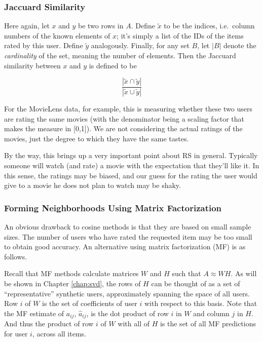 \subsubsection{Jaccuard Similarity}

Here again, let $x$ and $y$ be two rows in $A$.  Define
$\widetilde{x}$ to be the indices, i.e.\ column numbers of the known
elements of $x$; it's simply a list of the IDs of the items rated by
this user.  Define $\widetilde{y}$ analogously.  Finally, for any set
$B$, let $|B|$ denote the \textit{cardinality} of the set, meaning the
number of elements.  Then the Jaccuard similarity between $x$ and $y$ is
defined to be

\begin{equation}
\frac{|\widetilde{x} \cap \widetilde{y}|}
{|\widetilde{x} \cup \widetilde{y}|}
\end{equation}

For the MovieLens data, for example, this is measuring whether these two
users are rating the same movies (with the denominator being a scaling
factor that makes the measure in [0,1]).  We are not considering the
actual ratings of the movies, just the degree to which they have the
same tastes.

By the way, this brings up a very important point about RS in general.
Typically someone will watch (and rate) a movie with the expectation
that they'll like it.  In this sense, the ratings may be biased, and our
guess for the rating the user would give to a movie he does not plan to
watch may be shaky. 

\subsubsection{Forming Neighborhoods Using Matrix Factorization}

An obvious drawback to cosine methods is that they are based on small
sample sizes.  The number of users who have rated the requested item may
be too small to obtain good accuracy.  An alternative using matrix
factorization (MF) is as follows.

Recall that MF methods calculate matrices $W$ and $H$ such that $A
\approx WH$.  As will be shown in Chapter \ref{chap:svd}, the rows of
$H$ can be thought of as a set of ``representative'' synthetic users,
approximately spanning the space of all users.  Row $i$ of $W$ is the
set of coefficients of user $i$ with respect to this basis.  Note that
the MF estimate of $a_{ij}$, $\widehat{a}_{ij}$, is the dot product of
row $i$ in $W$ and column $j$ in $H$.  And thus the product of row $i$
of $W$ with all of $H$ is the set of all MF  predictions for user $i$,
across all items.

